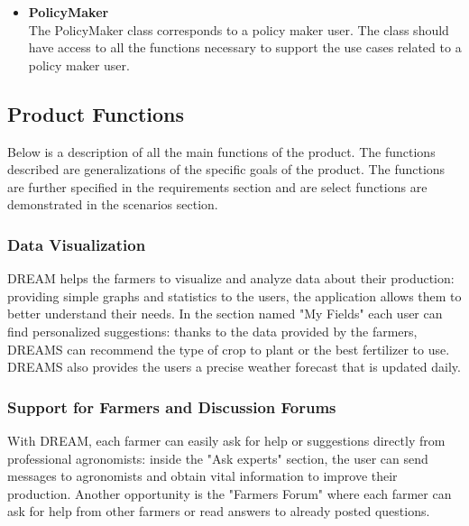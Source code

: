 \begin{itemize}
\item \textbf{PolicyMaker}\\
The PolicyMaker class corresponds to a policy maker user. The class should have access to all the functions necessary to support the use cases related to a policy maker user. 
\end{itemize}

\subsection{Product Functions}
\begin{flushleft}

Below is a description of all the main functions of the product. The functions described are generalizations of the specific goals of the product. The functions are further specified in the requirements section and are select functions are demonstrated in the scenarios section. 

\subsubsection{Data Visualization}
DREAM helps the farmers to visualize and analyze data about their production: providing simple graphs and statistics to the users, the application allows them to better understand their needs. In the section named "My Fields" each user can find personalized suggestions: thanks to the data provided by the farmers, DREAMS can recommend the type of crop to plant or the best fertilizer to use. DREAMS also provides the users a precise weather forecast that is updated daily.

\subsubsection{Support for Farmers and Discussion Forums}
With DREAM, each farmer can easily ask for help or suggestions directly from professional agronomists: inside the "Ask experts" section, the user can send messages to agronomists and obtain vital information to improve their production. Another opportunity is the "Farmers Forum" where each farmer can ask for help from other farmers or read answers to already posted questions.


\end{flushleft}
